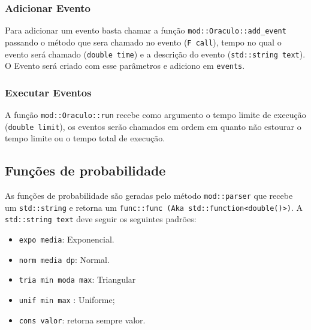 \documentclass{article}
\begin{document}
\subsubsection{Adicionar Evento} 
Para adicionar um evento basta chamar a função \texttt{mod::Oraculo::add\_event} passando o
método que sera chamado no evento (\texttt{F call}), tempo no qual o evento será chamado
(\texttt{double time}) e a descrição do evento (\texttt{std::string text}). O Evento será
criado com esse parâmetros e adiciono em \texttt{events}.

\subsubsection{Executar Eventos}
A função \texttt{mod::Oraculo::run} recebe como argumento o tempo limite de execução
(\texttt{double limit}), os eventos serão chamados em ordem em quanto não estourar
o tempo limite ou o tempo total de execução.

\subsection{Funções de probabilidade}
As funções de probabilidade são geradas pelo método \texttt{mod::parser} que recebe um 
\texttt{std::string} e retorna um \texttt{func::func (Aka std::function<double()>)}. 
A \texttt{std::string text} deve seguir os seguintes padrões:
\begin{itemize}
  \item \texttt{expo media}: Exponencial.
  \item \texttt{norm media dp}: Normal.
  \item \texttt{tria min moda max}: Triangular
  \item \texttt{unif min max} : Uniforme;
  \item \texttt{cons valor}: retorna sempre valor.
\end{itemize}
\end{document}
